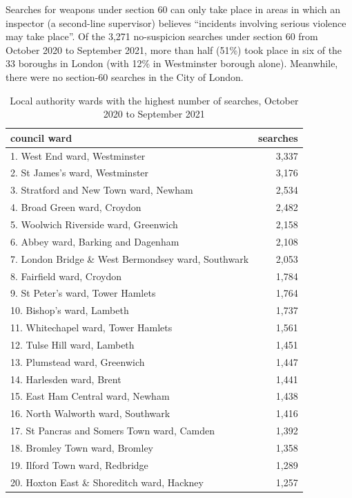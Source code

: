 \documentclass[
  a4paper,
  twoside, 11pt]{article}
\begin{document}
Searches for weapons under section 60 can only take place in areas in which an inspector (a second-line supervisor) believes ``incidents involving serious violence may take place''. Of the 3,271 no-suspicion searches under section 60 from October 2020 to September 2021, more than half (51\%) took place in six of the 33 boroughs in London (with 12\% in Westminster borough alone). Meanwhile, there were no section-60 searches in the City of London.

\begin{table}

\caption{\label{tab:table-ward}Local authority wards with the highest number of searches, October 2020 to September 2021}
\centering
\begin{tabular}[t]{lr}
\toprule
council ward & searches\\
\midrule
1. West End ward, Westminster & 3,337\\
2. St James's ward, Westminster & 3,176\\
3. Stratford and New Town ward, Newham & 2,534\\
4. Broad Green ward, Croydon & 2,482\\
5. Woolwich Riverside ward, Greenwich & 2,158\\
6. Abbey ward, Barking and Dagenham & 2,108\\
7. London Bridge \& West Bermondsey ward, Southwark & 2,053\\
8. Fairfield ward, Croydon & 1,784\\
9. St Peter's ward, Tower Hamlets & 1,764\\
10. Bishop's ward, Lambeth & 1,737\\
11. Whitechapel ward, Tower Hamlets & 1,561\\
12. Tulse Hill ward, Lambeth & 1,451\\
13. Plumstead ward, Greenwich & 1,447\\
14. Harlesden ward, Brent & 1,441\\
15. East Ham Central ward, Newham & 1,438\\
16. North Walworth ward, Southwark & 1,416\\
17. St Pancras and Somers Town ward, Camden & 1,392\\
18. Bromley Town ward, Bromley & 1,358\\
19. Ilford Town ward, Redbridge & 1,289\\
20. Hoxton East \& Shoreditch ward, Hackney & 1,257\\
\bottomrule
\end{tabular}
\end{table}
\end{document}
